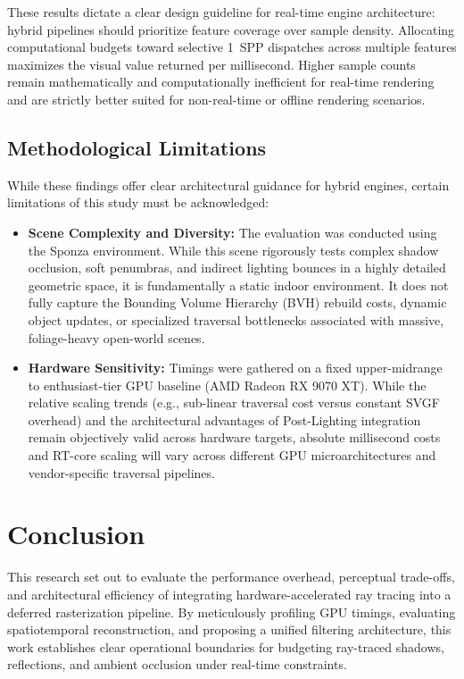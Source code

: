 \documentclass[12pt,a4paper]{report}
\newcommand{\daechapter}[1]{
  \chapter{#1}
}
\begin{document}
These results dictate a clear design guideline for real-time engine architecture: hybrid pipelines should prioritize feature coverage over sample density.
Allocating computational budgets toward selective 1~SPP dispatches across multiple features maximizes the visual value returned per millisecond.
Higher sample counts remain mathematically and computationally inefficient for real-time rendering and are strictly better suited for non-real-time or offline rendering scenarios.

\section{Methodological Limitations}
While these findings offer clear architectural guidance for hybrid engines, certain limitations of this study must be acknowledged:

\begin{itemize}
    \item \textbf{Scene Complexity and Diversity:} The evaluation was conducted using the Sponza environment. While this scene rigorously tests complex shadow occlusion, soft penumbras, and indirect lighting bounces in a highly detailed geometric space, it is fundamentally a static indoor environment. It does not fully capture the Bounding Volume Hierarchy (BVH) rebuild costs, dynamic object updates, or specialized traversal bottlenecks associated with massive, foliage-heavy open-world scenes.
    
    \item \textbf{Hardware Sensitivity:} Timings were gathered on a fixed upper-midrange to enthusiast-tier GPU baseline (AMD Radeon RX 9070 XT). While the relative scaling trends (e.g., sub-linear traversal cost versus constant SVGF overhead) and the architectural advantages of Post-Lighting integration remain objectively valid across hardware targets, absolute millisecond costs and RT-core scaling will vary across different GPU microarchitectures and vendor-specific traversal pipelines.
\end{itemize}

\daechapter{Conclusion}

This research set out to evaluate the performance overhead, perceptual trade-offs, and architectural efficiency of integrating hardware-accelerated ray tracing into a deferred rasterization pipeline.
By meticulously profiling GPU timings, evaluating spatiotemporal reconstruction, and proposing a unified filtering architecture, this work establishes clear operational boundaries for budgeting ray-traced shadows, reflections,
and ambient occlusion under real-time constraints.
\end{document}
